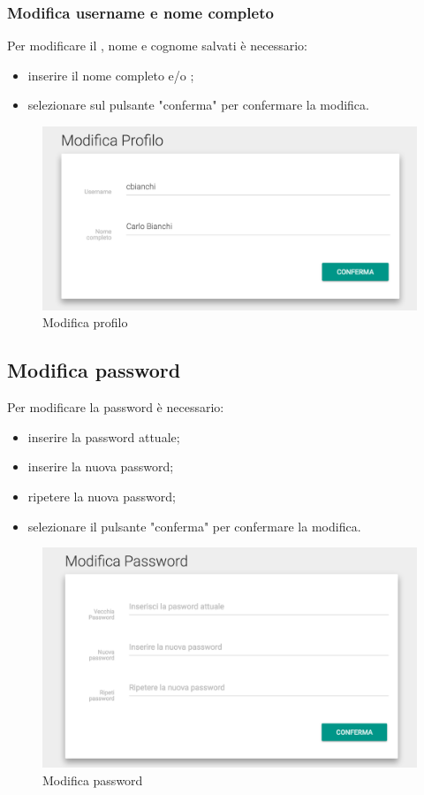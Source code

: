 \documentclass[12pt,a4paper]{article}
\begin{document}
	\subsubsection{Modifica username e nome completo}
	Per modificare il , nome e cognome salvati è necessario:
	\begin{itemize}
		\item inserire il nome completo e/o ;
		\item selezionare sul pulsante "conferma" per confermare la modifica.
	\end{itemize}
	\begin{figure}[h]	
		\centering
		\includegraphics[width=1.0\linewidth]{../img/screenshot/user1.png}
		\caption{Modifica profilo}
		\label{Modifica profilo}
	\end{figure}

	
	\subsection{Modifica password}
	Per modificare la password  è necessario:
	\begin{itemize}
		\item inserire la password attuale;
		\item inserire la nuova password;
		\item ripetere la nuova password;
		\item selezionare il pulsante "conferma" per confermare la modifica.
	\end{itemize}
	\begin{figure}[h]
		\centering
		\includegraphics[width=1.0\linewidth]{../img/screenshot/user2.png}
		\caption{Modifica password}
		\label{Modifica password}
	\end{figure}
	
\end{document}
